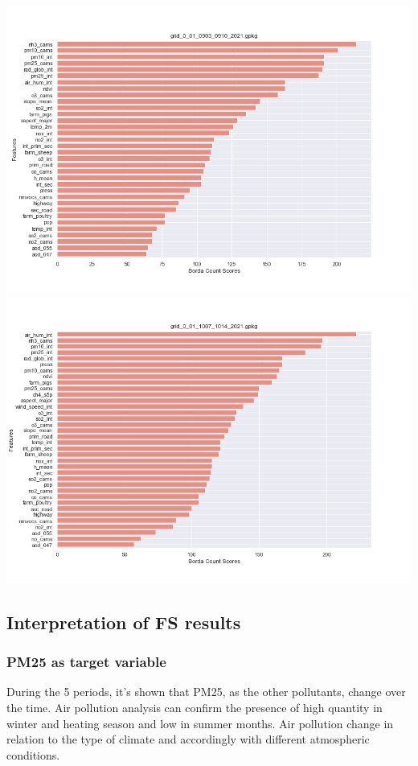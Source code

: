 \begin{center}
\includegraphics[width=.9\textwidth]{images/fs_results/nh3/001/no_montains/grid_0_01_0903_0910_2021.png}
\includegraphics[width=.9\textwidth]{images/fs_results/nh3/001/no_montains/grid_0_01_1007_1014_2021.png}
\end{center}
\subsection{Interpretation of FS results}
\subsubsection{PM25 as target variable}
During the 5 periods, it's shown that PM25, as the other pollutants, change over the time. 
Air pollution analysis can confirm the presence of high quantity in winter and heating season and low in summer months\cite{cichowicz2017dispersion}.
Air pollution change in relation to the type of climate and accordingly with different atmospheric conditions.

